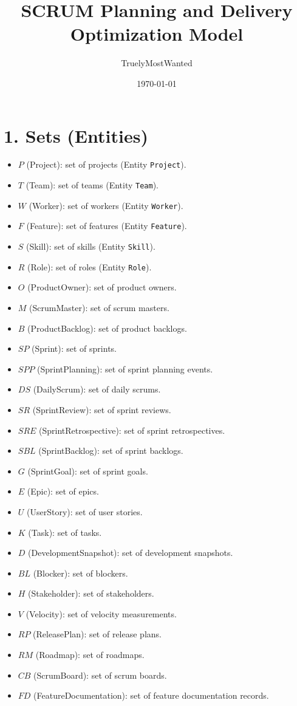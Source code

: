 \documentclass[11pt]{article}
\title{SCRUM Planning and Delivery Optimization Model}
\author{TruelyMostWanted}
\date{\today}
\begin{document}
\maketitle
\tableofcontents
\newpage

\section{1. Sets (Entities)}
\begin{itemize}[leftmargin=2em]
  \item $P$ (Project): set of projects (Entity \texttt{Project}).
  \item $T$ (Team): set of teams (Entity \texttt{Team}).
  \item $W$ (Worker): set of workers (Entity \texttt{Worker}).
  \item $F$ (Feature): set of features (Entity \texttt{Feature}).
  \item $S$ (Skill): set of skills (Entity \texttt{Skill}).
  \item $R$ (Role): set of roles (Entity \texttt{Role}).
  \item $O$ (ProductOwner): set of product owners.
  \item $M$ (ScrumMaster): set of scrum masters.
  \item $B$ (ProductBacklog): set of product backlogs.
  \item $SP$ (Sprint): set of sprints.
  \item $SPP$ (SprintPlanning): set of sprint planning events.
  \item $DS$ (DailyScrum): set of daily scrums.
  \item $SR$ (SprintReview): set of sprint reviews.
  \item $SRE$ (SprintRetrospective): set of sprint retrospectives.
  \item $SBL$ (SprintBacklog): set of sprint backlogs.
  \item $G$ (SprintGoal): set of sprint goals.
  \item $E$ (Epic): set of epics.
  \item $U$ (UserStory): set of user stories.
  \item $K$ (Task): set of tasks.
  \item $D$ (DevelopmentSnapshot): set of development snapshots.
  \item $BL$ (Blocker): set of blockers.
  \item $H$ (Stakeholder): set of stakeholders.
  \item $V$ (Velocity): set of velocity measurements.
  \item $RP$ (ReleasePlan): set of release plans.
  \item $RM$ (Roadmap): set of roadmaps.
  \item $CB$ (ScrumBoard): set of scrum boards.
  \item $FD$ (FeatureDocumentation): set of feature documentation records.
\end{itemize}
\end{document}
